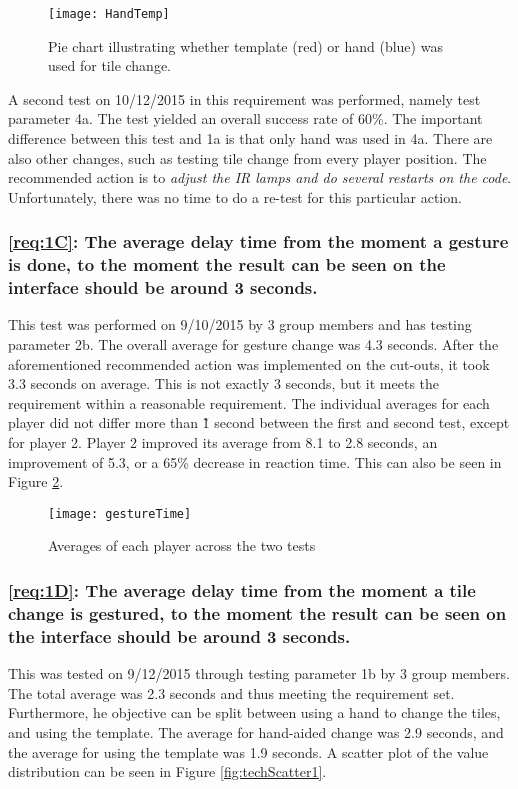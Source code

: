 \begin{figure}[h!]
	\centering
	\texttt{[image: HandTemp]}
	\caption{Pie chart illustrating whether template (red) or hand (blue) was used for tile change.} 
	\label{fig:techHandTemp}
\end{figure}
	
	A second test on 10/12/2015 in this requirement was performed, namely test parameter 4a. The test yielded an overall success rate of 60\%. The important difference between this test and 1a is that only hand was used in 4a. There are also other changes, such as testing tile change from every player position. The recommended action is to \textit{adjust the IR lamps and do several restarts on the code}. Unfortunately, there was no time to do a re-test for this particular action.
	
	\subsubsection*{\ref{req:1C}: The average delay time from the moment a gesture is done, to the moment the result can be seen on the interface should be around 3 seconds.}
	This test was performed on 9/10/2015 by 3 group members and has testing parameter 2b. The overall average for gesture change was 4.3 seconds. After the aforementioned recommended action was implemented on the cut-outs, it took 3.3 seconds on average. This is not exactly 3 seconds, but it meets the requirement within a reasonable requirement. The individual averages for each player did not differ more than \~1 second between the first and second test, except for player 2. Player 2 improved its average from 8.1 to 2.8 seconds, an improvement of 5.3, or a 65\% decrease in reaction time. This can also be seen in Figure \ref{fig:techGestureTime}.
	
\begin{figure}[h!]
	\centering
	\texttt{[image: gestureTime]}
	\caption{Averages of each player across the two tests} 
	\label{fig:techGestureTime}
\end{figure}

	\subsubsection*{\ref{req:1D}: The average delay time from the moment a tile change is gestured, to the moment the result can be seen on the interface should be around 3 seconds.}
	This was tested on 9/12/2015 through testing parameter 1b by 3 group members. The total average was 2.3 seconds and thus meeting the requirement set. Furthermore, he objective can be split between using a hand to change the tiles, and using the template. The average for hand-aided change was 2.9 seconds, and the average for using the template was 1.9 seconds. A scatter plot of the value distribution can be seen in Figure \ref{fig:techScatter1}.
	
